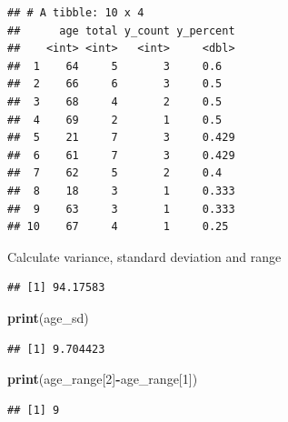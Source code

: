 \documentclass[
]{article}
\newenvironment{Shaded}{\begin{snugshade}}{\end{snugshade}}
\newcommand{\DecValTok}[1]{\textcolor[rgb]{0.00,0.00,0.81}{#1}}
\newcommand{\FunctionTok}[1]{\textcolor[rgb]{0.13,0.29,0.53}{\textbf{#1}}}
\newcommand{\NormalTok}[1]{#1}
\newcommand{\OtherTok}[1]{\textcolor[rgb]{0.56,0.35,0.01}{#1}}
\newcommand{\SpecialCharTok}[1]{\textcolor[rgb]{0.81,0.36,0.00}{\textbf{#1}}}
\begin{document}
\begin{verbatim}
## # A tibble: 10 x 4
##      age total y_count y_percent
##    <int> <int>   <int>     <dbl>
##  1    64     5       3     0.6  
##  2    66     6       3     0.5  
##  3    68     4       2     0.5  
##  4    69     2       1     0.5  
##  5    21     7       3     0.429
##  6    61     7       3     0.429
##  7    62     5       2     0.4  
##  8    18     3       1     0.333
##  9    63     3       1     0.333
## 10    67     4       1     0.25
\end{verbatim}

Calculate variance, standard deviation and range

\begin{Shaded}
\end{Shaded}

\begin{verbatim}
## [1] 94.17583
\end{verbatim}

\begin{Shaded}
\begin{Highlighting}[]
\FunctionTok{print}\NormalTok{(age\_sd)}
\end{Highlighting}
\end{Shaded}

\begin{verbatim}
## [1] 9.704423
\end{verbatim}

\begin{Shaded}
\begin{Highlighting}[]
\FunctionTok{print}\NormalTok{(age\_range[}\DecValTok{2}\NormalTok{]}\SpecialCharTok{{-}}\NormalTok{age\_range[}\DecValTok{1}\NormalTok{])}
\end{Highlighting}
\end{Shaded}

\begin{verbatim}
## [1] 9
\end{verbatim}
\end{document}
